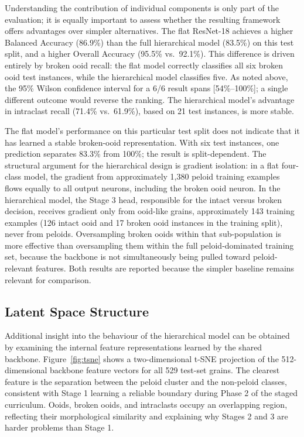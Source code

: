 \documentclass[a4paper,fleqn]{cas-dc}
\begin{document}
Understanding the contribution of individual components is only part of the evaluation; it is equally important to assess whether the resulting framework offers advantages over simpler alternatives. The flat ResNet-18 achieves a higher Balanced Accuracy (86.9\%) than the full hierarchical model (83.5\%) on this test split, and a higher Overall Accuracy (95.5\% vs.\ 92.1\%). This difference is driven entirely by broken ooid recall: the flat model correctly classifies all six broken ooid test instances, while the hierarchical model classifies five. As noted above, the 95\% Wilson confidence interval for a 6/6 result spans [54\%--100\%]; a single different outcome would reverse the ranking. The hierarchical model's advantage in intraclast recall (71.4\% vs.\ 61.9\%), based on 21 test instances, is more stable.

The flat model's performance on this particular test split does not indicate that it has learned a stable broken-ooid representation. With six test instances, one prediction separates 83.3\% from 100\%; the result is split-dependent. The structural argument for the hierarchical design is gradient isolation: in a flat four-class model, the gradient from approximately 1,380 peloid training examples flows equally to all output neurons, including the broken ooid neuron. In the hierarchical model, the Stage 3 head, responsible for the intact versus broken decision, receives gradient only from ooid-like grains, approximately 143 training examples (126 intact ooid and 17 broken ooid instances in the training split), never from peloids. Oversampling broken ooids within that sub-population is more effective than oversampling them within the full peloid-dominated training set, because the backbone is not simultaneously being pulled toward peloid-relevant features. Both results are reported because the simpler baseline remains relevant for comparison.

\subsection{Latent Space Structure}

Additional insight into the behaviour of the hierarchical model can be obtained by examining the internal feature representations learned by the shared backbone. Figure~\ref{fig:tsne} shows a two-dimensional t-SNE \citep{vandermaaten2008tsne} projection of the 512-dimensional backbone feature vectors for all 529 test-set grains. The clearest feature is the separation between the peloid cluster and the non-peloid classes, consistent with Stage 1 learning a reliable boundary during Phase 2 of the staged curriculum. Ooids, broken ooids, and intraclasts occupy an overlapping region, reflecting their morphological similarity and explaining why Stages 2 and 3 are harder problems than Stage 1.
\end{document}
